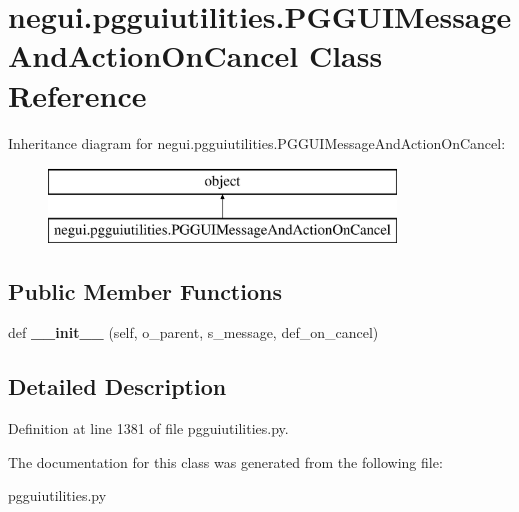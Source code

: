 \hypertarget{classnegui_1_1pgguiutilities_1_1PGGUIMessageAndActionOnCancel}{}\section{negui.\+pgguiutilities.\+P\+G\+G\+U\+I\+Message\+And\+Action\+On\+Cancel Class Reference}
\label{classnegui_1_1pgguiutilities_1_1PGGUIMessageAndActionOnCancel}
Inheritance diagram for negui.\+pgguiutilities.\+P\+G\+G\+U\+I\+Message\+And\+Action\+On\+Cancel\+:\begin{figure}[H]
\begin{center}
\leavevmode
\includegraphics[height=2.000000cm]{classnegui_1_1pgguiutilities_1_1PGGUIMessageAndActionOnCancel}
\end{center}
\end{figure}
\subsection*{Public Member Functions}
\begin{DoxyCompactItemize}
\item 
def {\bfseries \+\_\+\+\_\+init\+\_\+\+\_\+} (self, o\+\_\+parent, s\+\_\+message, def\+\_\+on\+\_\+cancel)\hypertarget{classnegui_1_1pgguiutilities_1_1PGGUIMessageAndActionOnCancel_a4274202cb2f6a6ef64a3928c9d433aff}{}\label{classnegui_1_1pgguiutilities_1_1PGGUIMessageAndActionOnCancel_a4274202cb2f6a6ef64a3928c9d433aff}

\end{DoxyCompactItemize}


\subsection{Detailed Description}


Definition at line 1381 of file pgguiutilities.\+py.



The documentation for this class was generated from the following file\+:\begin{DoxyCompactItemize}
\item 
pgguiutilities.\+py\end{DoxyCompactItemize}
